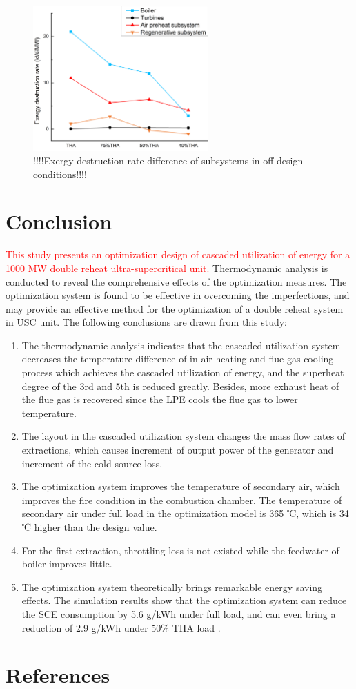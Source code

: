 \documentclass[preprint,12pt]{elsarticle}
\begin{document}
\begin{figure}[htbp]
\centering
\includegraphics[width=0.6\textwidth]{fig/partload_subsys_exergyrate.png}
\caption{!!!!Exergy destruction rate difference of subsystems in off-design conditions!!!!} 
\label{fig:partload_subsys_exergyrate}
\end{figure}


\section{Conclusion}
\textcolor{red}{This study presents an optimization design of cascaded utilization of energy for a 1000 MW double reheat ultra-supercritical unit.}
Thermodynamic analysis is conducted to reveal the comprehensive effects of the optimization measures. 
The optimization system is found to be effective in overcoming the imperfections, and may provide an effective method for the optimization of a double reheat system in USC unit.
The following conclusions are drawn from this study: 
 \begin{enumerate}[(1)]
\item The thermodynamic analysis indicates that the cascaded utilization system decreases the temperature difference of in air heating and flue gas cooling process which achieves the cascaded utilization of energy, and the superheat degree of the 3rd and 5th is reduced greatly. 
Besides, more exhaust heat of the flue gas is recovered since the LPE cools the flue gas to lower temperature. 
\item The layout in the cascaded utilization system changes the mass flow rates of extractions, which causes increment of output power of the generator and increment of the cold source loss.
\item The optimization system improves the temperature of secondary air, which improves the fire condition in the combustion chamber.
 The temperature of secondary air under full load in the optimization model is 365 ℃, which is 34 ℃ higher than the design value.
\item For the first extraction, throttling loss is not existed while the feedwater of boiler improves little.  
\item The optimization system theoretically brings remarkable energy saving effects. The simulation results show that the optimization system can reduce the SCE consumption by 5.6 g/kWh under full load, and can even bring a reduction of 2.9 g/kWh under 50\% THA load .
\end{enumerate}

\section*{References}



\end{document}
